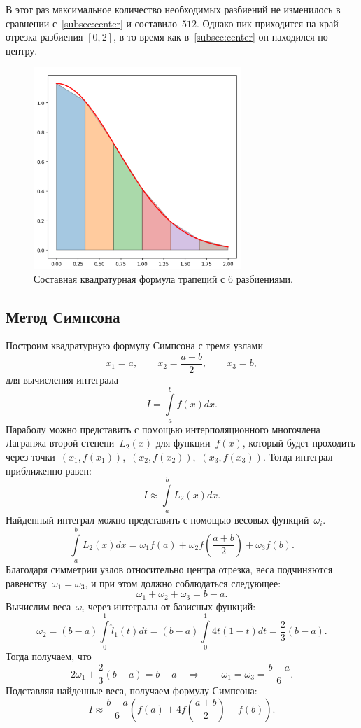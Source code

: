 \documentclass[a4paper, 14pt]{extarticle}
\begin{document}
    В этот раз максимальное количество необходимых разбиений не изменилось в сравнении с~\ref{subsec:center}
    и составило~$512$.
    Однако пик приходится на край отрезка разбиения $[0,2]$, в то время как
    в~\ref{subsec:center} он находился по центру.

    \begin{figure}[H]
        \centering
        \includegraphics[width=0.7\textwidth]{img/trapezoid}
        \caption{Составная квадратурная формула трапеций с 6 разбиениями.}
        \label{fig:Trapezoids}
    \end{figure}

    \subsection{Метод Симпсона}\label{subsec:simpson}
    Построим квадратурную формулу Симпсона с тремя узлами
    $$ x_1=a, \qquad x_2=\frac{a+b}{2}, \qquad x_3=b, $$
    для вычисления интеграла
    $$ I = \int\limits_a^b f(x)dx. $$
    Параболу можно представить с помощью интерполяционного многочлена
    Лагранжа второй степени~$L_2(x)$ для функции~$f(x)$, который будет проходить через
    точки~$(x_1,f(x_1))$,~$(x_2,f(x_2))$,~$(x_3,f(x_3))$.
    Тогда интеграл приближенно равен:
    $$ I \approx \int\limits_a^b L_2(x)dx. $$
    Найденный интеграл можно представить с помощью весовых функций~$\omega_i$.
    $$ \int\limits_a^b L_2(x)dx = \omega_1 f(a) + \omega_2 f\left(\frac{a+b}{2}\right) + \omega_3 f(b). $$
    Благодаря симметрии узлов относительно центра отрезка, веса подчиняются
    равенству~$\omega_1 = \omega_3$, и при этом должно соблюдаться следующее:
    $$ \omega_1 + \omega_2 + \omega_3 = b-a. $$
    Вычислим веса~$\omega_i$ через интегралы от базисных функций:
    $$ \omega_2 = (b-a) \int\limits_0^1 \hat{l}_1(t) dt = (b-a) \int\limits_0^1 4t(1-t)dt = \frac{2}{3}(b-a). $$
    Тогда получаем, что
    $$ 2\omega_1 + \frac{2}{3}(b-a) = b-a \quad \Rightarrow \qquad \omega_1 = \omega_3 = \frac{b-a}{6}. $$
    Подставляя найденные веса, получаем формулу Симпсона:
    \begin{equation}
        \label{eq:Quadrature_Formula_Simpson}
        I \approx \frac{b-a}{6} \left(f(a) + 4 f\left(\frac{a+b}{2}\right) + f(b)\right).
    \end{equation}
\end{document}
